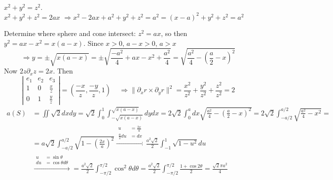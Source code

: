\documentclass[twoside]{amsart}
\theoremstyle{plain}
\theoremstyle{definition}
\newcommand{\exercisehead}[1]
  {
   \noindent{\small\bf Exercise #1.}
   \smallskip}
\begin{document}
\exercisehead{6} $x^2  +y^2 = z^2$.  \\
$x^2  + y^2 + z^2 = 2ax$ $\Longrightarrow x^2  - 2ax + a^2 + y^2 +z^2 = a^2 = (x-a)^2 + y^2 + z^2 = a^2$ 

Determine where sphere and cone intersect: $z^2 =ax$, so then $y^2 = ax - x^2 = x(a-x)$.  Since $x > 0$, $a-x>0$, $a>x$
\[
\Longrightarrow y = \pm \sqrt{ x ( a-x)} = \pm \sqrt{ \frac{-a^2}{4} + ax - x^2 + \frac{a^2}{4} } = \sqrt{ \frac{a^2 }{4} - \left( \frac{a}{2} - x\right)^2 }
\] 
Now $ 2z \partial_x z = 2x$.  Then
\[
\left| \begin{matrix} e_1 & e_2 & e_3 \\ 1 & 0 & \frac{x}{z} \\ 0 & 1 & \frac{y}{z} \end{matrix} \right| = ( \frac{-x}{z}, \frac{-y}{z}, 1 ) \quad \, \Longrightarrow \| \partial_x r \times \partial_y r \|^2 = \frac{x^2}{z^2 } + \frac{y^2}{z^2} + \frac{z^2}{z^2} = 2 
\]
\[
\begin{aligned}
  a(S) & = \iint \sqrt{2} dx dy = \sqrt{2} \int_0^1 \int_{-\sqrt{x(a-x)}}^{\sqrt{ x(a-x)}} dy dx = 2 \sqrt{2} \int_0^a dx \sqrt{ \frac{a^2}{4} - \left( \frac{a}{2} - x \right)^2 } = 2\sqrt{2} \int_{-a/2}^{a/2} \sqrt{ \frac{a^2}{4} - x^2 } = \\
  & = a\sqrt{2} \int_{-a/2}^{a/2} \sqrt{ 1 - \left( \frac{2x}{a} \right)^2} \xrightarrow{\begin{aligned} u & = \frac{2x}{a} \\ \frac{a}{2} du & = dx \end{aligned}} \frac{a^2 \sqrt{2}}{2} \int_{-1}^1 \sqrt{ 1 - u^2 } du \\ 
 & \xrightarrow{ \begin{aligned} u & = \sin{\theta} \\ du & = \cos{\theta} d\theta \end{aligned}}  = \frac{a^2\sqrt{2}}{2} \int_{-\pi/2}^{\pi/2} \cos^2{\theta} d\theta = \frac{a^2 \sqrt{2}}{2} \int_{-\pi/2}^{\pi/2} \frac{ 1 + \cos{2\theta}}{2} = \boxed{ \frac{ \sqrt{2} \pi a^2}{4} }
\end{aligned}
\]

















\end{document}
